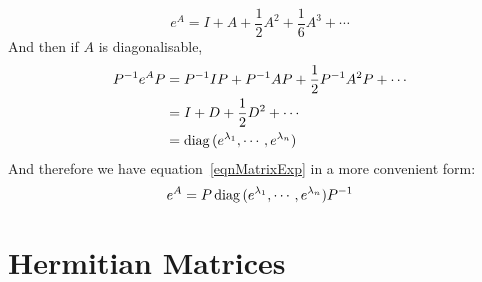 \documentclass[../Main.tex]{subfiles}
\begin{document}
\begin{equation}
    e^A = I + A + \frac{1}{2} A^2 + \frac{1}{6} A^3 + \cdots
    \label{eqnMatrixExp}
\end{equation}
And then if $A$ is diagonalisable,
\begin{align*}
    P^{-1} e^A P &= P^{-1} I P + P^{-1} A P + \frac{1}{2}P^{-1} A^2 P + \cdots \\
    &= I + D + \frac{1}{2} D^2 + \cdots \\
    &= \operatorname{diag}{(e^{\lambda_1}, \cdots, e^{\lambda_n})}
\end{align*}
And therefore we have equation~\ref{eqnMatrixExp} in a more convenient form:
\begin{equation}
    e^A = P \operatorname{diag}{(e^{\lambda_1}, \cdots, e^{\lambda_n})} P^{-1}
    \label{eqnMatrixExpSimpler}
\end{equation}
\section{Hermitian Matrices}
\end{document}
